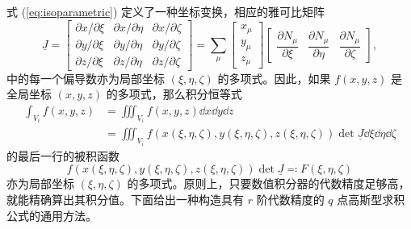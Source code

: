 式 (\ref{eq:isoparametric}) 定义了一种坐标变换，相应的雅可比矩阵
\begin{equation}
\underline{J}=\begin{bmatrix}\partial x/\partial\xi & \partial x/\partial\eta & \partial x/\partial\zeta\\
\partial y/\partial\xi & \partial y/\partial\eta & \partial y/\partial\zeta\\
\partial z/\partial\xi & \partial z/\partial\eta & \partial z/\partial\zeta
\end{bmatrix}=\sum_{\mu}\begin{bmatrix}x_{\mu}\\
y_{\mu}\\
z_{\mu}
\end{bmatrix}\begin{bmatrix}\dfrac{\partial N_{\mu}}{\partial\xi} & \dfrac{\partial N_{\mu}}{\partial\eta} & \dfrac{\partial N_{\mu}}{\partial\zeta}\end{bmatrix},
\end{equation}
中的每一个偏导数亦为局部坐标 $(\xi,\eta,\zeta)$ 的多项式。因此，如果 $f(x,y,z)$ 是全局坐标 $(x,y,z)$
的多项式，那么积分恒等式
\begin{equation}
\begin{aligned}\int_{V_{i}}f(x,y,z) & =\iiint_{V_{i}}f(x,y,z)\dd{x}\dd{y}\dd{z}\\
 & =\iiint_{V_{i}}f(x(\xi,\eta,\zeta),y(\xi,\eta,\zeta),z(\xi,\eta,\zeta))\det\underline{J}\dd{\xi}\dd{\eta}\dd{\zeta}
\end{aligned}
\label{eq:volume_integral}
\end{equation}
的最后一行的被积函数
\begin{equation}
f(x(\xi,\eta,\zeta),y(\xi,\eta,\zeta),z(\xi,\eta,\zeta))\det\underline{J}\eqqcolon F(\xi,\eta,\zeta)
\end{equation}
亦为局部坐标 $(\xi,\eta,\zeta)$ 的多项式。原则上，只要数值积分器的代数精度足够高，就能精确算出其积分值。下面给出一种构造具有
$r$ 阶代数精度的 $q$ 点高斯型求积公式的通用方法。

